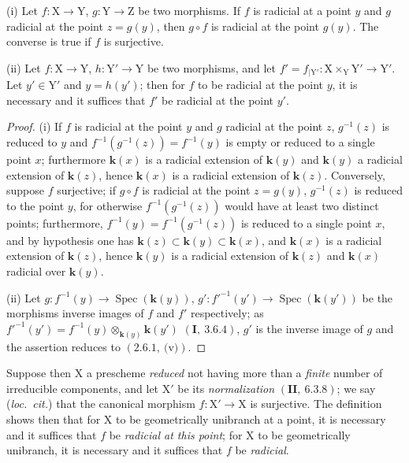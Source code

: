 \begin{lemma}[6.15.3.1]
\label{IV.6.15.3.1}
(i) Let $f:\mathrm{X}\to\mathrm{Y}$, $g:\mathrm{Y}\to\mathrm{Z}$ be two morphisms. If $f$ is radicial
at a point $y$ and $g$ radicial at the point $z=g(y)$, then $g\circ f$ is radicial at the point $g(y)$. The converse
is true if $f$ is surjective.

(ii) Let $f:\mathrm{X}\to\mathrm{Y}$, $h:\mathrm{Y}'\to\mathrm{Y}$ be two morphisms, and let $f'=f_{|\mathrm{Y}'}:\mathrm{X}\times_\mathrm{Y}\mathrm{Y}'\to\mathrm{Y}'$.
Let $y'\in\mathrm{Y}'$ and $y=h(y')$; then for $f$ to be radicial at the point $y$, it is necessary and it suffices that $f'$ be
radicial at the point $y'$.
\end{lemma}

\begin{proof}
(i) If $f$ is radicial at the point $y$ and $g$ radicial at the point $z$, $g^{-1}(z)$ is reduced to $y$ and
$f^{-1}(g^{-1}(z))=f^{-1}(y)$ is empty or reduced to a single point $x$; furthermore $\boldsymbol{k}(x)$ is a radicial extension
of $\boldsymbol{k}(y)$ and $\boldsymbol{k}(y)$ a radicial extension of $\boldsymbol{k}(z)$, hence $\boldsymbol{k}(x)$ is a radicial extension of $\boldsymbol{k}(z)$.
Conversely, suppose $f$ surjective; if $g\circ f$ is radicial at the point $z=g(y)$, $g^{-1}(z)$ is reduced
to the point $y$, for otherwise $f^{-1}(g^{-1}(z))$ would have at least two distinct points; furthermore,
$f^{-1}(y)=f^{-1}(g^{-1}(z))$ is reduced to a single point $x$, and by hypothesis one has $\boldsymbol{k}(z)\subset\boldsymbol{k}(y)\subset\boldsymbol{k}(x)$,
and $\boldsymbol{k}(x)$ is a radicial extension of $\boldsymbol{k}(z)$, hence $\boldsymbol{k}(y)$ is a radicial extension of $\boldsymbol{k}(z)$ and $\boldsymbol{k}(x)$ radicial over $\boldsymbol{k}(y)$.

\begingroup{}
(ii) Let $g:f^{-1}(y)\to\operatorname{Spec}(\boldsymbol{k}(y))$, $g':f'^{-1}(y')\to\operatorname{Spec}(\boldsymbol{k}(y'))$ be the morphisms
inverse images of \mbox{\ensuremath{f}} and $f'$ respectively; as $f'^{-1}(y')=f^{-1}(y)\otimes_{\boldsymbol{k}(y)}\boldsymbol{k}(y')$
$(\mathbf{I},~3.6.4)$, $g'$ is the inverse image of $g$ and the assertion reduces to $(2.6.1,~\text{(v)})$.
\par\endgroup
\end{proof}

Suppose then $\mathrm{X}$ a prescheme \emph{reduced} not having more than a \emph{finite} number of irreducible components,
and let $\mathrm{X}'$ be its \emph{normalization} $(\mathbf{II},~6.3.8)$; we say (\emph{loc.~cit.}) that the canonical morphism
$f:\mathrm{X}'\to\mathrm{X}$ is surjective. The definition  shows then that for $\mathrm{X}$ to be geometrically
unibranch at a point, it is necessary and it suffices that $f$ be \emph{radicial at this point}; for
$\mathrm{X}$ to be geometrically unibranch, it is necessary and it suffices that $f$ be \emph{radicial}.


